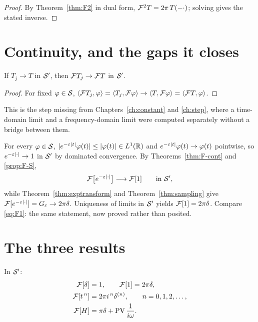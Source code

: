 \begin{proof}
By Theorem~\ref{thm:F2} in dual form, $\mathcal{F}^{2}T=2\pi\,T(-\cdot)$; solving gives the stated inverse.
\end{proof}

\section{Continuity, and the gaps it closes}

\begin{theorem}\label{thm:F-cont}
If $T_{j}\to T$ in $\mathcal{S}'$, then $\mathcal{F} T_{j}\to\mathcal{F} T$ in $\mathcal{S}'$.
\end{theorem}

\begin{proof}
For fixed $\varphi\in\mathcal{S}$,
$\langle \mathcal{F} T_{j},\varphi\rangle=\langle T_{j},\mathcal{F}\varphi\rangle\to\langle T,\mathcal{F}\varphi\rangle=\langle \mathcal{F} T,\varphi\rangle$.
\end{proof}

This is the step missing from Chapters~\ref{ch:constant} and \ref{ch:step}, where a time-domain limit
and a frequency-domain limit were computed separately without a bridge between them.

\begin{example}
For every $\varphi\in\mathcal{S}$, $|e^{-\varepsilon|t|}\varphi(t)|\le|\varphi(t)|\in L^{1}(\mathbb{R})$ and
$e^{-\varepsilon|t|}\varphi(t)\to\varphi(t)$ pointwise, so $e^{-\varepsilon|\cdot|}\to1$ in $\mathcal{S}'$ by dominated
convergence. By Theorems~\ref{thm:F-cont} and \ref{prop:F-S},
\begin{equation}
\mathcal{F}\big[e^{-\varepsilon|\cdot|}\big]\longrightarrow\mathcal{F}[1]
\qquad\text{in }\mathcal{S}',
\end{equation}
while Theorem~\ref{thm:exptransform} and Theorem~\ref{thm:sampling} give
$\mathcal{F}[e^{-\varepsilon|\cdot|}]=G_{\varepsilon}\to2\pi\delta$. Uniqueness of limits in $\mathcal{S}'$ yields
$\mathcal{F}[1]=2\pi\delta$. Compare \eqref{eq:F1}: the same statement, now proved rather than posited.
\end{example}

\section{The three results}

\begin{theorem}\label{thm:main}
In $\mathcal{S}'$:
\begin{align}
\mathcal{F}[\delta]&=1, \qquad \mathcal{F}[1]=2\pi\delta, \label{eq:Fdelta}\\
\mathcal{F}[t^{\,n}]&=2\pi i^{\,n}\delta^{(n)},\qquad n=0,1,2,\dots, \label{eq:Ftn}\\
\mathcal{F}[H]&=\pi\delta+\operatorname{PV}\frac{1}{i\omega}. \label{eq:FHgen}
\end{align}
\end{theorem}

